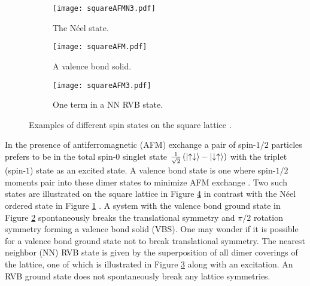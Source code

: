\documentclass[aps,pra,preprint,groupedaddress]{revtex4-1}
\newcommand{\1}{\mathds{1}}
\begin{document}
\begin{figure}
	\centering
	\begin{subfigure}{.5\textwidth}
		\centering
		\texttt{[image: squareAFMN3.pdf]}
		\caption{The N\'eel state.}
		\label{fig:Neel}
	\end{subfigure}%
	\begin{subfigure}{.5\textwidth}
		\centering
		\texttt{[image: squareAFM.pdf]}
		\caption{A valence bond solid.}
		\label{fig:VBS}
	\end{subfigure}
	\begin{subfigure}{.6\textwidth}
		\centering
		\texttt{[image: squareAFM3.pdf]}
		\caption{One term in a NN RVB state.}
		\label{fig:RVB}
	\end{subfigure}
	\caption{Examples of different spin states on the square lattice \cite{Sachdev}.}
	\label{fig:square}
\end{figure}

In the presence of antiferromagnetic (AFM) exchange a pair of spin-$1/2$ particles prefers to be in the total spin-$0$ singlet state $\frac{1}{\sqrt{2}}\left(\ket{\uparrow \downarrow} - \ket{\downarrow \uparrow }\right)$ with the triplet (spin-$1$) state as an excited state. A valence bond state is one where spin-$1/2$ moments pair into these dimer states to minimize AFM exchange \cite{Baskaran2}. Two such states are illustrated on the square lattice in Figure \ref{fig:square} in contrast with the N\'eel ordered state in Figure \ref{fig:Neel} \cite{Sachdev}. A system with the valence bond ground state in Figure \ref{fig:VBS} spontaneously breaks the translational symmetry and $\pi/2$ rotation symmetry forming a valence bond solid (VBS). %
One may wonder if it is possible for a valence bond ground state not to break translational symmetry. The nearest neighbor (NN) RVB state is given by the superposition of all dimer coverings of the lattice, one of which is illustrated in Figure \ref{fig:RVB} along with an excitation. An RVB ground state does not spontaneously break any lattice symmetries. %


\end{document}
